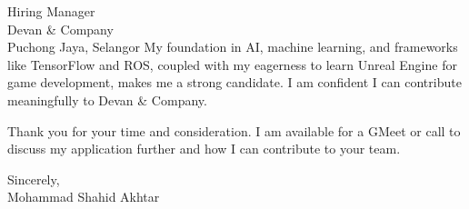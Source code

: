 \documentclass[10.5pt]{letter}
\begin{document}
\begin{letter}{Hiring Manager\\Devan \& Company\\Puchong Jaya, Selangor}
\vspace{0.5cm}
My foundation in AI, machine learning, and frameworks like TensorFlow and ROS, coupled with my eagerness to learn Unreal Engine for game development, makes me a strong candidate. I am confident I can contribute meaningfully to Devan \& Company.

\vspace{0.3cm}
Thank you for your time and consideration. I am available for a GMeet or call to discuss my application further and how I can contribute to your team.

\vspace{0.3cm}
\begin{flushleft}
Sincerely,\\[2ex]
Mohammad Shahid Akhtar
\end{flushleft}

\end{letter}
\end{document}
